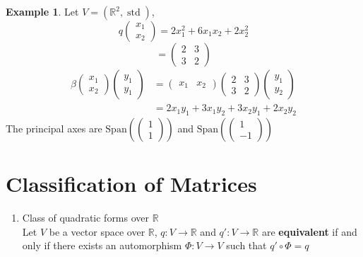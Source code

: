 \documentclass[letterpaper,12pt]{article}
\theoremstyle{definition}
\newtheorem*{example}{Example}
\newcommand{\Span}[1]{\text{Span}\left(#1 \right)}
\begin{document}
\begin{example}
Let $V = (\mathbb{R}^2, \operatorname{std})$,
\begin{equation*}
    q \begin{pmatrix} x_1 \\ x_2 \end{pmatrix} = 2x_1^2 + 6x_1 x_2 + 2x_2^2
\end{equation*}
\begin{equation*}
    [q] = \begin{pmatrix} 2 & 3 \\ 3 & 2 \end{pmatrix}
\end{equation*}
\begin{align*}
    \beta \begin{pmatrix} x_1 \\ x_2 \end{pmatrix} \begin{pmatrix} y_1 \\ y_1 \end{pmatrix} & = \begin{pmatrix} x_1 & x_2 \end{pmatrix} \begin{pmatrix} 2 & 3 \\ 3 & 2 \end{pmatrix} \begin{pmatrix} y_1 \\ y_2 \end{pmatrix} \\
    & = 2x_1 y_1 + 3x_1 y_2 + 3x_2 y_1 + 2x_2 y_2
\end{align*}
The principal axes are $\Span{\begin{pmatrix} 1 \\ 1 \end{pmatrix}}$ and $\Span{\begin{pmatrix} 1 \\ -1 \end{pmatrix}}$
\end{example}


\section*{Classification of Matrices}
\begin{enumerate}
    \item Class of quadratic forms over $\mathbb{R}$
    \\ Let $V$ be a vector space over $\mathbb{R}$, $q: V \rightarrow \mathbb{R}$ and $q': V \rightarrow \mathbb{R}$ are \textbf{equivalent} if and only if there exists an automorphism $\Phi: V \rightarrow V$ such that $q' \circ \Phi = q$
\end{enumerate}
\end{document}
